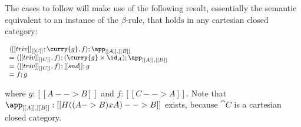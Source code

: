 The cases to follow will make use of the following result, essentially
the semantic equivalent to an instance of the $\beta$-rule, that holds
in any cartesian closed category:
\begin{center}
  \begin{math} \footnotesize
    \begin{array}{lll}        
      \langle [[triv]]_{[[C]]};\curry{g}, f\rangle;\app_{[[A]],[[B]]}\\
      = \langle [[triv]]_{[[C]]}, f\rangle;(\curry{g} \times \id_A);\app_{[[A]],[[B]]}\\
      = \langle [[triv]]_{[[C]]}, f\rangle;[[snd]];g\\
      = f;g\\
    \end{array}
  \end{math}
\end{center}
where $g : [[A --> B]]$ and $f : [[C --> A]]$.  Note that
$\app_{[[A]],[[B]]} : [[H((A -> B) x A) --> B]]$ exists, because
$\cat{C}$ is a cartesian closed category.
